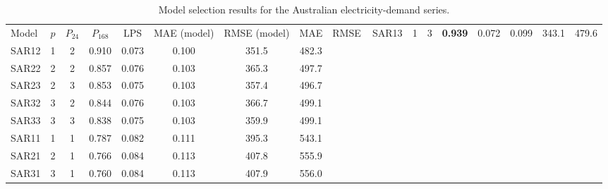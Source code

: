 \begin{table}[htbp]
\centering
\caption{Model selection results for the Australian electricity-demand series.}
\label{tab:aus_model_selection}
\begin{tabular}{lcccccccc}
\toprule
Model & $p$ & $P_{24}$ & $P_{168}$ & LPS & MAE (model) & RMSE (model) & MAE & RMSE \
\midrule
SAR13 & 1 & 3 & \textbf{0.939} & 0.072 & 0.099 & 343.1 & 479.6 \\
SAR12 & 1 & 2 & 0.910 & 0.073 & 0.100 & 351.5 & 482.3 \\
SAR22 & 2 & 2 & 0.857 & 0.076 & 0.103 & 365.3 & 497.7 \\
SAR23 & 2 & 3 & 0.853 & 0.075 & 0.103 & 357.4 & 496.7 \\
SAR32 & 3 & 2 & 0.844 & 0.076 & 0.103 & 366.7 & 499.1 \\
SAR33 & 3 & 3 & 0.838 & 0.075 & 0.103 & 359.9 & 499.1 \\
SAR11 & 1 & 1 & 0.787 & 0.082 & 0.111 & 395.3 & 543.1 \\
SAR21 & 2 & 1 & 0.766 & 0.084 & 0.113 & 407.8 & 555.9 \\
SAR31 & 3 & 1 & 0.760 & 0.084 & 0.113 & 407.9 & 556.0 \\
\bottomrule
\end{tabular}
\end{table}
